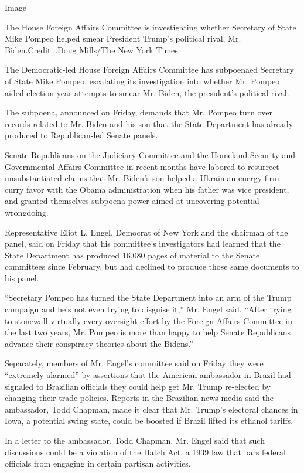 Image

The House Foreign Affairs Committee is investigating whether Secretary
of State Mike Pompeo helped smear President Trump's political rival, Mr.
Biden.Credit...Doug Mills/The New York Times

The Democratic-led House Foreign Affairs Committee has subpoenaed
Secretary of State Mike Pompeo, escalating its investigation into
whether Mr. Pompeo aided election-year attempts to smear Mr. Biden, the
president's political rival.

The subpoena, announced on Friday, demands that Mr. Pompeo turn over
records related to Mr. Biden and his son that the State Department has
already produced to Republican-led Senate panels.

Senate Republicans on the Judiciary Committee and the Homeland Security
and Governmental Affairs Committee in recent months
\href{https://www.nytimes.com/2020/05/20/us/politics/trump-biden-subpoena.html}{have
labored to resurrect unsubstantiated claims} that Mr. Biden's son helped
a Ukrainian energy firm curry favor with the Obama administration when
his father was vice president, and granted themselves subpoena power
aimed at uncovering potential wrongdoing.

Representative Eliot L. Engel, Democrat of New York and the chairman of
the panel, said on Friday that his committee's investigators had learned
that the State Department has produced 16,080 pages of material to the
Senate committees since February, but had declined to produce those same
documents to his panel.

``Secretary Pompeo has turned the State Department into an arm of the
Trump campaign and he's not even trying to disguise it,'' Mr. Engel
said. ``After trying to stonewall virtually every oversight effort by
the Foreign Affairs Committee in the last two years, Mr. Pompeo is more
than happy to help Senate Republicans advance their conspiracy theories
about the Bidens.''

Separately, members of Mr. Engel's committee said on Friday they were
``extremely alarmed'' by assertions that the American ambassador in
Brazil had signaled to Brazilian officials they could help get Mr. Trump
re-elected by changing their trade policies. Reports in the Brazilian
news media said the ambassador, Todd Chapman, made it clear that Mr.
Trump's electoral chances in Iowa, a potential swing state, could be
boosted if Brazil lifted its ethanol tariffs.

In a letter to the ambassador, Todd Chapman, Mr. Engel said that such
discussions could be a violation of the Hatch Act, a 1939 law that bars
federal officials from engaging in certain partisan activities.

